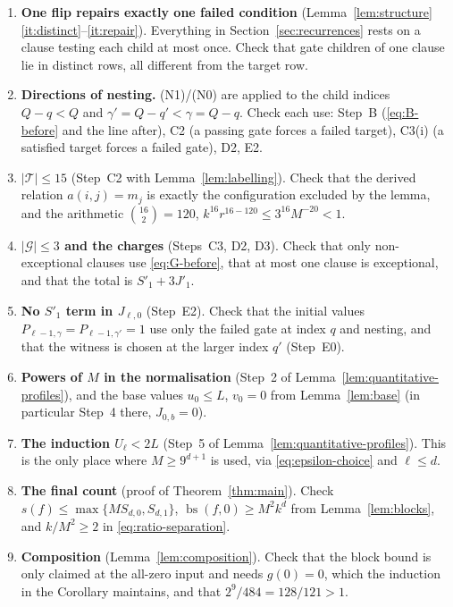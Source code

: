 \documentclass[11pt]{article}
\newcommand{\bs}{\operatorname{bs}}
\theoremstyle{definition}
\theoremstyle{remark}
\begin{document}
\begin{enumerate}[leftmargin=2em]
\item \textbf{One flip repairs exactly one failed condition}
 (Lemma~\ref{lem:structure}\ref{it:distinct}--\ref{it:repair}). Everything
 in Section~\ref{sec:recurrences} rests on a clause testing each child at
 most once. Check that gate children of one clause lie in distinct rows,
 all different from the target row.
\item \textbf{Directions of nesting.} (N1)/(N0) are applied to the child
 indices \(Q-q<Q\) and \(\gamma'=Q-q'<\gamma=Q-q\). Check each use: Step~B
 (\eqref{eq:B-before} and the line after), C2 (a passing gate forces a
 failed target), C3(i) (a satisfied target forces a failed gate), D2, E2.
\item \textbf{\(|\mathcal T|\le15\)} (Step~C2 with
 Lemma~\ref{lem:labelling}). Check that the derived relation
 \(a(i,j)=m_j\) is exactly the configuration excluded by the lemma, and
 the arithmetic \(\binom{16}{2}=120\), \(k^{16}r^{16-120}\le3^{16}M^{-20}<1\).
\item \textbf{\(|\mathcal G|\le3\) and the charges} (Steps~C3, D2, D3). Check
 that only non-exceptional clauses use \eqref{eq:G-before}, that at most
 one clause is exceptional, and that the total is \(S'_1+3J'_1\).
\item \textbf{No \(S'_1\) term in \(J_{\ell,0}\)} (Step~E2). Check that the
 initial values \(P_{\ell-1,\gamma}=P_{\ell-1,\gamma'}=1\) use only the
 failed gate at index \(q\) and nesting, and that the witness is chosen at
 the larger index \(q'\) (Step~E0).
\item \textbf{Powers of \(M\) in the normalisation} (Step~2 of
 Lemma~\ref{lem:quantitative-profiles}), and the base values
 \(u_0\le L\), \(v_0=0\) from Lemma~\ref{lem:base} (in particular Step~4
 there, \(J_{0,b}=0\)).
\item \textbf{The induction \(U_\ell<2L\)} (Step~5 of
 Lemma~\ref{lem:quantitative-profiles}). This is the only place where
 \(M\ge9^{d+1}\) is used, via \eqref{eq:epsilon-choice} and \(\ell\le d\).
\item \textbf{The final count} (proof of Theorem~\ref{thm:main}). Check
 \(s(f)\le\max\{MS_{d,0},S_{d,1}\}\), \(\bs(f,0)\ge M^2k^d\) from
 Lemma~\ref{lem:blocks}, and \(k/M^2\ge2\) in
 \eqref{eq:ratio-separation}.
\item \textbf{Composition} (Lemma~\ref{lem:composition}). Check that the
 block bound is only claimed at the all-zero input and needs \(g(0)=0\),
 which the induction in the Corollary maintains, and that
 \(2^9/484=128/121>1\).
\end{enumerate}



\end{document}
